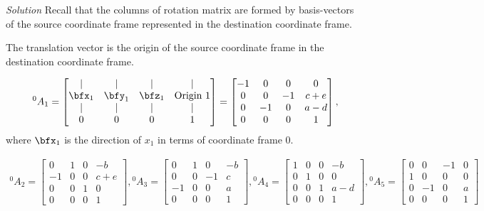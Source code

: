 \documentclass{article}
\numberwithin{prob}{section}
\newenvironment{solution}{\emph{Solution}}{}
\begin{document}
\begin{solution}
Recall that the columns of rotation matrix are formed by basis-vectors of the source coordinate frame represented in the destination coordinate frame.

The translation vector is the origin of the source coordinate frame in the destination coordinate frame.

\begin{align}
  {}^0A_1 = \begin{bmatrix}
    | & | & | & | \\
    \bfx_1 & \bfy_1 & \bfz_1 & \text{Origin 1} \\
    | & | & | & | \\
    0 & 0 & 0 & 1
  \end{bmatrix}
  = \begin{bmatrix}
    -1 & 0 & 0 & 0 \\
    0 & 0 & -1 & c+e\\
    0 & -1 & 0 & a - d\\
    0 & 0 & 0 & 1
  \end{bmatrix}
  ,
\end{align}
where $\bfx_1$ is the direction of $x_1$ in terms of coordinate frame 0.

\begin{align}
  {}^0A_2 = \begin{bmatrix}
    0  & 1 &  0 & -b \\
    -1 & 0 &  0  & c+e\\
    0  & 0 &  1 & 0\\
    0  & 0 &  0 & 1
  \end{bmatrix}
  ,
  {}^0A_3 = \begin{bmatrix}
     0 & 1 &  0 & -b \\
     0 & 0 & -1  & c\\
    -1 & 0 &  0 &  a \\
     0 & 0 &  0 & 1
  \end{bmatrix}
  ,
  {}^0A_4 = \begin{bmatrix}
     1 & 0 &  0 & -b \\
     0 & 1 &  0 & 0 \\
     0 & 0 &  1 & a-d  \\
     0 & 0 &  0 & 1
  \end{bmatrix}
  ,
  {}^0A_5 = \begin{bmatrix}
     0 &  0 & -1 & 0\\
     1 &  0 &  0 & 0\\
     0 & -1 &  0 & a\\
     0 &  0 &  0 & 1
  \end{bmatrix}
\end{align}


\end{solution}
\end{document}
